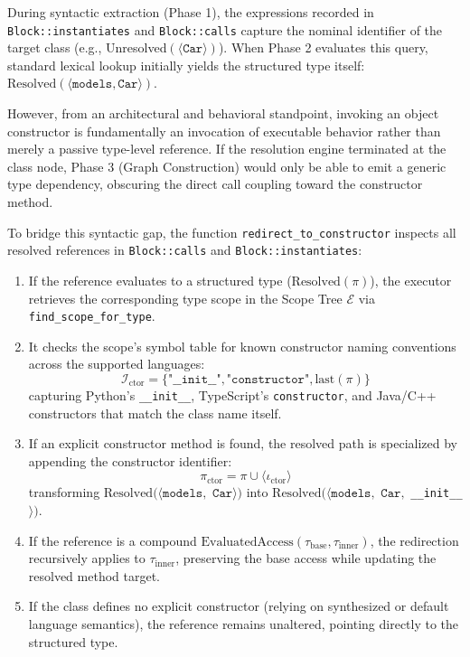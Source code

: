 During syntactic extraction (Phase 1), the expressions recorded in
\texttt{Block::}\-\texttt{instantiates}
and \texttt{Block::calls} capture the nominal identifier of the
target class (e.g.,
Un\-re\-solved$(\langle \texttt{Car} \rangle)$). When Phase 2
evaluates this query,
standard lexical lookup initially yields the structured type itself:\
$\text{Resolved}(\langle \texttt{models}, \texttt{Car} \rangle)$.

However, from an architectural and behavioral standpoint, invoking an
object constructor
is fundamentally an invocation of executable behavior rather than
merely a passive
type-level reference. If the resolution engine terminated at the
class node, Phase 3
(Graph Construction) would only be able to emit a generic type
dependency, obscuring
the direct call coupling toward the constructor method.

To bridge this syntactic gap, the function
\texttt{redirect\_to\_constructor} inspects
all resolved references in \texttt{Block::calls} and
\texttt{Block::instantiates}:

\begin{enumerate}
  \item If the reference evaluates to a structured type
    ($\text{Resolved}(\pi)$), the
    executor retrieves the corresponding type scope in the Scope Tree
    $\mathcal{E}$ via
    \texttt{find\_scope\_for\_type}.
  \item It checks the scope's symbol table for known constructor
    naming conventions
    across the supported languages:
    $$\mathcal{I}_{\text{ctor}} = \{ \texttt{"\_\_init\_\_"},
    \texttt{"constructor"}, \text{last}(\pi) \}$$
    capturing Python's \texttt{\_\_init\_\_}, TypeScript's
    \texttt{constructor}, and
    Java/C++ constructors that match the class name itself.
  \item If an explicit constructor method is found, the resolved path
    is specialized
    by appending the constructor identifier:
    $$\pi_{\text{ctor}} = \pi \cup \langle \iota_{\text{ctor}} \rangle$$
    transforming $\text{Resolved}(\langle \texttt{models},$
    $\texttt{Car} \rangle)$ into
    $\text{Resolved}(\langle \texttt{models},$ $\texttt{Car},$
    \texttt{\_\_in}\-\texttt{it\_\_}$\rangle)$.
  \item If the reference is a compound
    $\text{EvaluatedAccess}(\tau_{\text{base}}, \tau_{\text{inner}})$,
    the redirection recursively applies to $\tau_{\text{inner}}$,
    preserving the base
    access while updating the resolved method target.
  \item If the class defines no explicit constructor (relying on
      synthesized or default
    language semantics), the reference remains unaltered, pointing
    directly to the
    structured type.
\end{enumerate}

